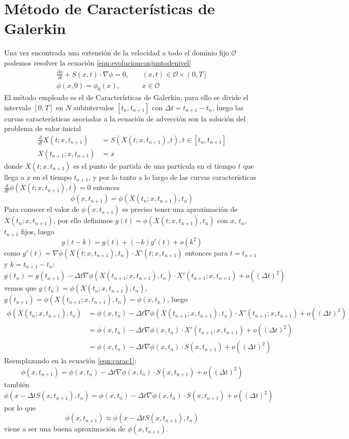 \section{Método de Características de Galerkin}
Una vez encontrada una extensión de la velocidad a todo el dominio fijo $\mathcal{O}$ podemos resolver la ecuación 	\ref{eqn:evolucionconjuntodenivel}
\[
\begin{aligned}	
	\frac{\partial \phi}{\partial t} + S(x,t)\cdot \nabla \phi =0,& \quad(x,t)\in\mathcal{O}\times \left(0,T\right] \\
	\phi(x,0)=\phi_0(x),&\quad x\in\mathcal{O}
\end{aligned}
\]
El método empleado es el de Características de Galerkin, para ello se divide el intervalo $[0,T]$ en $N$ subintervalos $[t_n,t_{n+1}]$ con $\Delta t=t_{n+1}-t_n$, luego las curvas características asociadas a la ecuación de advección son la solución del problema de valor inicial
\[
\begin{aligned}	
	\frac{d}{dt} X(t;x,t_{n+1})&=S(X(t;x,t_{n+1}),t),t\in [t_n,t_{n+1}] \\
	X(t_{n+1};x,t_{n+1}) &= x
\end{aligned}
\]
donde $X(t;x,t_{n+1})$ es el punto de partida de una partícula en el tiempo $t$ que llega a $x$ en el tiempo $t_{n+1}$, y
por lo tanto a lo largo de las curvas características $\frac{d}{dt} \phi (X(t;x,t_{n+1}),t)=0$ entonces
\begin{equation}
	\phi (x,t_{n+1})=\phi (X(t_n;x,t_{n+1}),t_n) 
	\label{eqn:carac1}
\end{equation}
Para conocer el valor de $\phi (x,t_{n+1})$ es preciso tener una aproximación de $X(t_n;x,t_{n+1})$, por ello definimos $g(t)=\phi (X(t;x,t_{n+1}),t_n)$ con $x$, $t_n$, $t_{n+1}$ fijos, luego
\[
g(t-k)=g(t)+(-k)g'(t)+o(k^2)
\]
como $g'(t)=\nabla \phi (X(t;x,t_{n+1}),t_n)\cdot X'(t;x,t_{n+1})$ entonces para $t=t_{n+1}$ y $k=t_{n+1}-t_n$:
\[
g(t_n)=g(t_{n+1})-\Delta t\nabla \phi (X(t_{n+1};x,t_{n+1}),t_n)\cdot X'(t_{n+1};x,t_{n+1})+o((\Delta t)^2)
\]
vemos que $g(t_n)=\phi (X(t_n;x,t_{n+1}),t_n)$, 
$g(t_{n+1})=\phi (X(t_{n+1};x,t_{n+1}),t_n)=\phi (x,t_n)$, luego 
\[
\begin{aligned}
	\phi (X(t_n;x,t_{n+1}),t_n) &= \phi (x,t_n)
	-\Delta t\nabla \phi (X(t_{n+1};x,t_{n+1}),t_n)\cdot X'(t_{n+1};x,t_{n+1})+o((\Delta t)^2)\\
	& = \phi (x,t_n)
	-\Delta t\nabla \phi (x,t_n)\cdot X'(t_{n+1};x,t_{n+1})+o((\Delta t)^2)\\
	&= \phi (x,t_n) 
	-\Delta t\nabla \phi (x,t_n)\cdot 
	S(x,t_{n+1})+o((\Delta t)^2)
\end{aligned}
\]
Reemplazando en la ecuación \ref{eqn:carac1}:
\[
\phi (x,t_{n+1})=\phi (x,t_n) 
-\Delta t\nabla \phi (x,t_n)\cdot 
S(x,t_{n+1})+o((\Delta t)^2)
\]
también
\[
\phi (x-\Delta tS(x,t_{n+1}),t_{n})=
\phi (x,t_{n}) -\Delta t\nabla \phi (x,t_n)\cdot 
S(x,t_{n+1})+o((\Delta t)^2)
\]
por lo que
\begin{equation}
	\phi (x,t_{n+1})\approx \phi (x-\Delta tS(x,t_{n+1}),t_{n})
	\label{eqn:nuevophih}
\end{equation}
viene a ser una buena aproximación de $\phi (x,t_{n+1})$.

